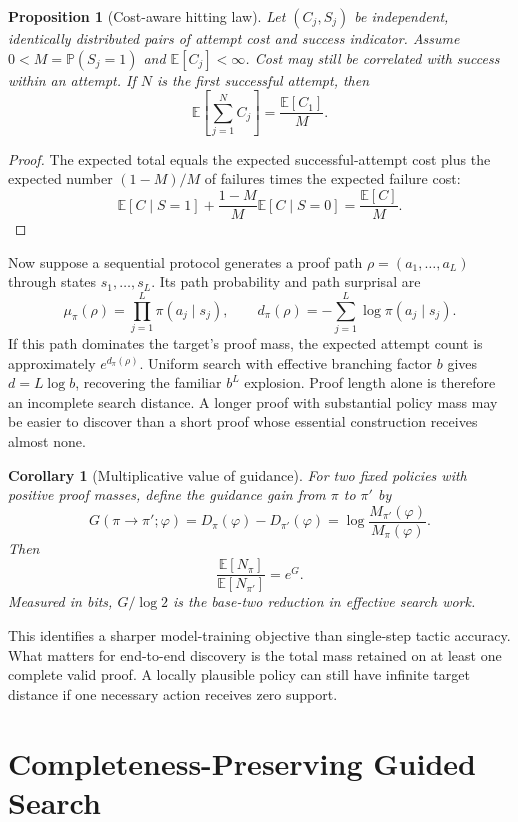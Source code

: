 \documentclass[11pt]{article}
\newtheorem{proposition}[definition]{Proposition}
\newtheorem{corollary}[definition]{Corollary}
\newcommand{\E}{\mathbb{E}}
\newcommand{\Prob}{\mathbb{P}}
\begin{document}
\begin{proposition}[Cost-aware hitting law]
\label{prop:cost-hitting}
Let $(C_j,S_j)$ be independent, identically distributed pairs of attempt cost
and success indicator.  Assume $0<M=\Prob(S_j=1)$ and
$\E[C_j]<\infty$.  Cost may still be correlated with success within an
attempt.  If $N$ is the first successful attempt, then
\[
  \E\!\left[\sum_{j=1}^{N}C_j\right]
  =\frac{\E[C_1]}{M}.
\]
\end{proposition}

\begin{proof}
The expected total equals the expected successful-attempt cost plus the
expected number $(1-M)/M$ of failures times the expected failure cost:
\[
 \E[C\mid S=1]
 +\frac{1-M}{M}\E[C\mid S=0]
 =\frac{\E[C]}{M}.
\]
\end{proof}

Now suppose a sequential protocol generates a proof path
$\rho=(a_1,\ldots,a_L)$ through states $s_1,\ldots,s_L$.  Its path probability
and path surprisal are
\[
  \mu_\pi(\rho)=\prod_{j=1}^{L}\pi(a_j\mid s_j),
  \qquad
  d_\pi(\rho)=-\sum_{j=1}^{L}\log\pi(a_j\mid s_j).
\]
If this path dominates the target's proof mass, the expected attempt count is
approximately $e^{d_\pi(\rho)}$.  Uniform search with effective branching
factor $b$ gives $d=L\log b$, recovering the familiar $b^L$ explosion.  Proof
length alone is therefore an incomplete search distance.  A longer proof with
substantial policy mass may be easier to discover than a short proof whose
essential construction receives almost none.

\begin{corollary}[Multiplicative value of guidance]
\label{cor:guidance}
For two fixed policies with positive proof masses, define the guidance gain
from $\pi$ to $\pi'$ by
\[
  G(\pi\to\pi';\varphi)
  =D_\pi(\varphi)-D_{\pi'}(\varphi)
  =\log\frac{M_{\pi'}(\varphi)}{M_\pi(\varphi)}.
\]
Then
\[
  \frac{\E[N_\pi]}{\E[N_{\pi'}]}=e^G.
\]
Measured in bits, $G/\log 2$ is the base-two reduction in effective search
work.
\end{corollary}

This identifies a sharper model-training objective than single-step tactic
accuracy.  What matters for end-to-end discovery is the total mass retained on
at least one complete valid proof.  A locally plausible policy can still have
infinite target distance if one necessary action receives zero support.

\section{Completeness-Preserving Guided Search}
\end{document}
